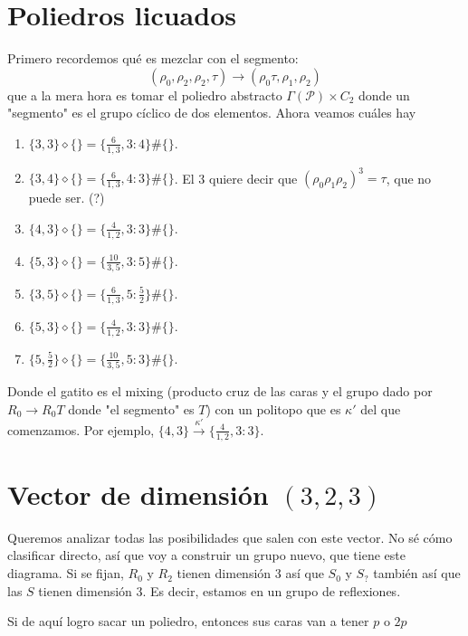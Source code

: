 \documentclass[spanish]{article}
\theoremstyle{definition}
\newcommand{\p}{\mathcal{P}}
\begin{document}
\section{Poliedros licuados}
Primero recordemos qué es mezclar con el segmento:
\[(\rho_0,\rho_2,\rho_2,\tau)\to(\rho_0\tau,\rho_1,\rho_2)\]
que a la mera hora es tomar el poliedro abstracto $\Gamma(\p)\times C_2$ donde un "segmento" es el grupo cíclico de dos elementos. Ahora veamos cuáles hay
\begin{enumerate}
	\item $\{3,3\}\diamond\{\}=\{\frac{6}{1,3},3:4\}\#\{\}$.
	
	\item $\{3,4\}\diamond\{\}=\{\frac{6}{1,3},4:3\}\#\{\}$. El 3 quiere decir que $(\rho_0\rho_1\rho_2)^3=\tau$, que no puede ser. {\color{magenta}(?)}
	
	\item $\{4,3\}\diamond\{\}=\{\frac{4}{1,2},3:3\}\#\{\}$.
	
	\item $\{5,3\}\diamond\{\}=\{\frac{10}{3,5},3:5\}\#\{\}$.
	
	\item $\{3,5\}\diamond\{\}=\{\frac{6}{1,3},5:\frac{5}{2}\}\#\{\}$.
	
	\item $\{5,3\}\diamond\{\}=\{\frac{4}{1,2},3:3\}\#\{\}$.
	
	\item 	$\{5,\frac{5}{2}\}\diamond\{\}=\{\frac{10}{3,5},5:3\}\#\{\}$.
\end{enumerate}

Donde el gatito es el mixing (producto cruz de las caras y el grupo dado por $R_0\to R_0T$ donde "el segmento" es $T$) con un politopo que es $\kappa'$ del que comenzamos. Por ejemplo, $\{4,3\}\overset{\kappa'}{\to}\{\frac{4}{1,2},3:3\}$.

\section{Vector de dimensión $(3,2,3)$}
Queremos analizar todas las posibilidades que salen con este vector. No sé cómo clasificar directo, así que voy a construir un grupo nuevo, que tiene este diagrama. Si se fijan, $R_0$ y $R_2$ tienen dimensión 3 así que $S_0$ y $S_?$ también así que las $S$ tienen dimensión 3. Es decir, estamos en un grupo de reflexiones.

Si de aquí logro sacar un poliedro, entonces sus caras van a tener $p$ o $2p$
\end{document}

